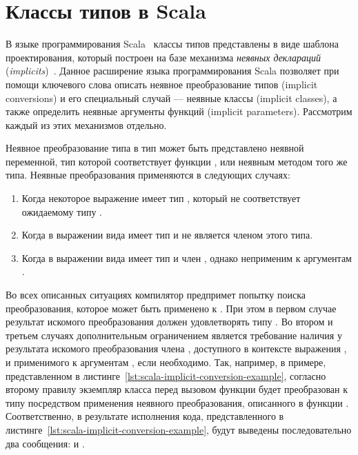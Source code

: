 \section{Классы типов в Scala}

В языке программирования Scala~\cite{OderskyACE07} классы типов представлены в виде шаблона проектирования, который построен на базе механизма \emph{неявных деклараций} (\emph{implicits})~\cite{LewisLMS00, Odersky06, OliveiraMO10}. Данное расширение языка программирования Scala позволяет при помощи ключевого слова  описать неявное преобразование типов (implicit conversions) и его специальный случай --- неявные классы (implicit classes), а также определить неявные аргументы функций (implicit parameters). Рассмотрим каждый из этих механизмов отдельно.

Неявное преобразование типа  в тип  может быть представлено неявной переменной, тип которой соответствует функции , или неявным методом того же типа. Неявные преобразования применяются в следующих случаях:
\begin{enumerate}
	\item Когда некоторое выражение  имеет тип , который не соответствует ожидаемому типу .
	\item Когда в выражении вида   имеет тип  и  не является членом этого типа. 
	\item Когда в выражении вида   имеет тип  и член , однако  неприменим к аргументам . 
\end{enumerate}
Во всех описанных ситуациях компилятор предпримет попытку поиска преобразования, которое может быть применено к . При этом в первом случае результат искомого преобразования должен удовлетворять типу . Во втором и третьем случаях дополнительным ограничением является требование наличия у результата искомого преобразования члена , доступного в контексте выражения , и применимого к аргументам , если необходимо. Так, например, в примере, представленном в листинге~\ref{lst:scala-implicit-conversion-example}, согласно второму правилу экземпляр класса   перед вызовом функции  будет преобразован к типу  посредством применения неявного преобразования, описанного в функции . Соответственно, в результате исполнения кода, представленного в листинге~\ref{lst:scala-implicit-conversion-example}, будут выведены последовательно два сообщения:  и .

